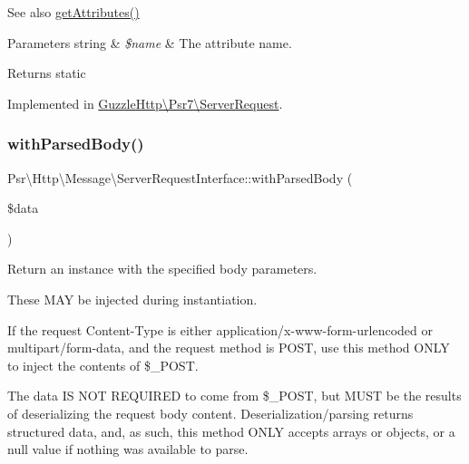 \begin{DoxySeeAlso}{See also}
\hyperlink{interfacePsr_1_1Http_1_1Message_1_1ServerRequestInterface_a0cda25a9b297c86e7813ffcb98ceb3df}{get\+Attributes()} 
\end{DoxySeeAlso}

\begin{DoxyParams}[1]{Parameters}
string & {\em \$name} & The attribute name. \\
\hline
\end{DoxyParams}
\begin{DoxyReturn}{Returns}
static 
\end{DoxyReturn}


Implemented in \hyperlink{classGuzzleHttp_1_1Psr7_1_1ServerRequest_ab1833188a1d67566219f083a6bb33cdf}{Guzzle\+Http\textbackslash{}\+Psr7\textbackslash{}\+Server\+Request}.

\mbox{\label{interfacePsr_1_1Http_1_1Message_1_1ServerRequestInterface_ac8dbe5e28829d7cb0d5b753eb5df8bc9}} 
\subsubsection{\texorpdfstring{with\+Parsed\+Body()}{withParsedBody()}}
{\footnotesize\ttfamily Psr\textbackslash{}\+Http\textbackslash{}\+Message\textbackslash{}\+Server\+Request\+Interface\+::with\+Parsed\+Body (\begin{DoxyParamCaption}\item[{}]{\$data }\end{DoxyParamCaption})}

Return an instance with the specified body parameters.

These M\+AY be injected during instantiation.

If the request Content-\/\+Type is either application/x-\/www-\/form-\/urlencoded or multipart/form-\/data, and the request method is P\+O\+ST, use this method O\+N\+LY to inject the contents of \$\+\_\+\+P\+O\+ST.

The data IS N\+OT R\+E\+Q\+U\+I\+R\+ED to come from \$\+\_\+\+P\+O\+ST, but M\+U\+ST be the results of deserializing the request body content. Deserialization/parsing returns structured data, and, as such, this method O\+N\+LY accepts arrays or objects, or a null value if nothing was available to parse.

